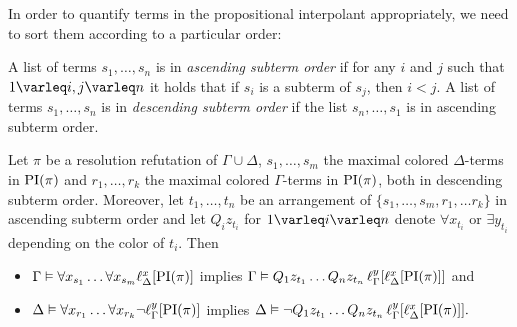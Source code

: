In order to quantify terms in the propositional interpolant appropriately, we need to sort them according to a particular order:

\begin{defi}
	A list of terms $s_1, \dots, s_n$ is in \emph{ascending subterm order} if for any
	$i$ and $j$ such that $1\varleq i,j \varleq n$ it holds that if $s_i$ is a subterm of $s_j$, then $i<j$.
	A list of terms $s_1, \dots, s_n$ is in \emph{descending subterm order} if the list $s_n, \dots, s_1$ is in ascending subterm order.
\end{defi}


\begin{lemma}
	\label{lemma:thm_induction}
	Let $\pi$ be a resolution refutation of $\Gamma \cup \Delta$,
	$s_1, \dots, s_m$ the maximal colored $\Delta$-terms in $\operatorname{PI}(\pi)$ and
	$r_1, \dots, r_k$ the maximal colored $\Gamma$-terms in $\operatorname{PI}(\pi)$, both in descending subterm order.
	Moreover, let $t_1, \dots, t_n$ be an arrangement of $\{ s_1, \dots, s_m, r_1, \dots r_k\}$ in ascending subterm order and
	let $Q_i z_{t_i}$ for $1\varleq i \varleq n$ denote $\forall x_{t_i}$ or $\exists y_{t_i}$ depending on the color of $t_i$.
	Then
	\begin{itemize}
		\item
			$\Gamma \vDash \forall x_{s_1} \dots \forall x_{s_m} \ell_{\Delta}^{x}[\operatorname{PI}(\pi)]$ implies
			$\Gamma \vDash Q_1 z_{t_1} \ldots Q_n z_{t_n}\,\ell_{\Gamma}^{y}[\ell_{\Delta}^{x}[\operatorname{PI}(\pi)]]$ 
			and
		\item
			$\Delta \vDash \forall x_{r_1} \dots \forall x_{r_k} \lnot \ell_{\Gamma}^{y}[\operatorname{PI}(\pi)]$ implies
			$\Delta \vDash \lnot Q_1 z_{t_1} \ldots Q_n z_{t_n}\,\ell_{\Gamma}^{y}[\ell_{\Delta}^{x}[\operatorname{PI}(\pi)]].$
	\end{itemize}
\end{lemma}
